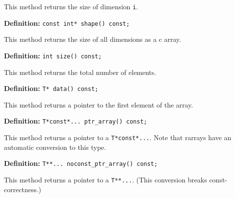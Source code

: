 \documentclass[11pt,twoside]{article}
\begin{document}
This method returns the size of dimension \texttt{i}.

\noindent\textbf{Definition:} \texttt{const int* shape() const;}

This method returns the size of all dimensions as a c array. 

\noindent\textbf{Definition:} \texttt{int size() const;}

This method returns the total number of elements.


\noindent\textbf{Definition:} \texttt{T* data() const;}

This method returns a pointer to the first element of the array.


\noindent\textbf{Definition:} \texttt{T*const*... ptr\_array() const;}

This method returns a pointer to a \texttt{T*const*...}.  Note that
rarrays have an automatic conversion to this type.


\noindent\textbf{Definition:} \texttt{T**... noconst\_ptr\_array() const;}

This method returns a pointer to a \texttt{T**...}. (This conversion breaks const-correctness.)

\end{document}

